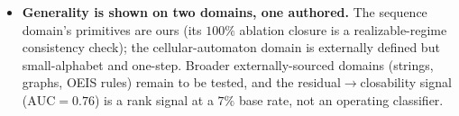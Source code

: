 \begin{itemize}[leftmargin=1.4em,itemsep=2pt]
  clustering over $20$ hand-chosen features. We measure robustness (high across $k$, ARI $0.73$--$0.98$;
  moderate across seeds, mean pairwise ARI $0.47$ on evaluation and $0.60$ on training), so only the coarse
  family structure should be trusted; and we do not yet provide the causal test that building the top-priority capability closes more
  tasks than a low-priority one. We present it as a prioritization hypothesis and release the per-task
  signatures so others can test it.
  \item \textbf{Generality is shown on two domains, one authored.} The sequence domain's primitives are ours
  (its $100\%$ ablation closure is a realizable-regime consistency check); the cellular-automaton domain is
  externally defined but small-alphabet and one-step. Broader externally-sourced domains (strings, graphs,
  OEIS rules) remain to be tested, and the residual$\to$closability signal ($\mathrm{AUC}=0.76$) is a rank
  signal at a $7\%$ base rate, not an operating classifier.
\end{itemize}
